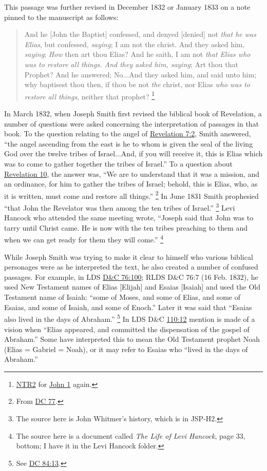 		This passage was further revised in December 1832 or January 1833 on a note pinned to the manuscript as follows:

		\begin{quote}
			And he [John the Baptist] confessed, and denyed [denied] not \textit{that he was Elias}, but confessed, \textit{saying}; I am not the christ. And they asked him, \textit{saying}; \textit{How} then art thou Elias? And he saith, I am not \textit{that Elias who was to restore all things. And they asked him, saying}; Art thou that Prophet? And he answered; No...And they asked him, and said unto him; why baptisest thou then, if thou be not \textit{the} christ, nor Elias \textit{who was to restore all things}, neither that prophet?%
				\footnote{%
					\hyperref[JST-NTR2]{NTR2} for \hyperref[JOHN-1]{John 1} again.
					}
		\end{quote}

		In March 1832, when Joseph Smith first revised the biblical book of Revelation, a number of questions were asked concerning the interpretation of passages in that book. To the question relating to the angel of \hyperref[REVELATION-7-2]{Revelation 7:2}, Smith answered, ``the angel ascending from the east is he to whom is given the seal of the living God over the twelve tribes of Israel...And, if you will receive it, this is Elias which was to come to gather together the tribes of Israel.'' To a question about \hyperref[REVELATION-10]{Revelation 10}, the answer was, ``We are to understand that it was a mission, and an ordinance, for him to gather the tribes of Israel; behold, this is Elias, who, as it is written, must come and restore all things.''%
			\footnote{%
				From \hyperref[DC77]{DC 77}.
				} 
		In June 1831 Smith prophesied ``that John the Revelator was then among the ten tribes of Israel.''%
			\footnote{%
				The source here is John Whitmer's history, which is in JSP-H2.
				}
		Levi Hancock who attended the same meeting wrote, ``Joseph said that John was to tarry until Christ came. He is now with the ten tribes preaching to them and when we can get ready for them they will come.''%
			\footnote{%
				The source here is a document called \textit{The Life of Levi Hancock}, page 33, bottom; I have it in the Levi Hancock folder.
				}

		While Joseph Smith was trying to make it clear to himself who various biblical personages were as he interpreted the text, he also created a number of confused passages. For example, in LDS \hyperref[DC76-100]{D\&C 76:100}; RLDS D\&C 76:7 (16 Feb. 1832), he used New Testament names of Elias [Elijah] and Esaias [Isaiah] and used the Old Testament name of Isaiah: ``some of Moses, and some of Elias, and some of Esaias, and some of Isaiah, and some of Enoch.'' Later it was said that ``Esaias also lived in the days of Abraham.''%
			\footnote{%
				See \hyperref[DC84-13]{DC 84:13}.
				}
		In LDS D\&C \hyperref[DC110-12]{110:12} mention is made of a vision when ``Elias appeared, and committed the dispensation of the gospel of Abraham.'' Some have interpreted this to mean the Old Testament prophet Noah (Elias = Gabriel = Noah), or it may refer to Esaias who ``lived in the days of Abraham.''

